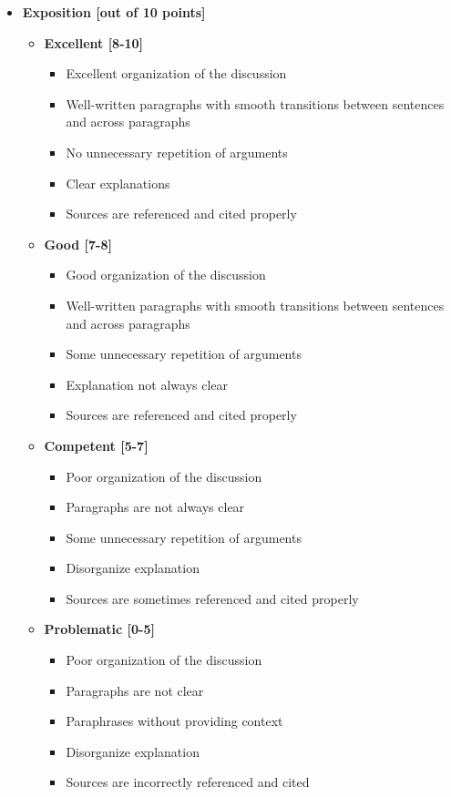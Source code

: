 \documentclass[letterpaper,12pt]{article}
\theoremstyle{dotlessS}
\begin{document}
\begin{itemize}
\item \textbf{Exposition [out of 10 points]}
\begin{itemize}
\item \textbf{Excellent [8-10]}
\begin{itemize}
\item Excellent organization of the discussion
\item Well-written paragraphs with smooth transitions between sentences and across paragraphs
\item No unnecessary repetition of arguments
\item Clear explanations
\item Sources are referenced and cited properly
\end{itemize}
\item \textbf{Good [7-8]}
\begin{itemize}
\item Good organization of the discussion
\item Well-written paragraphs with smooth transitions between sentences and across paragraphs
\item Some unnecessary repetition of arguments
\item Explanation not always clear
\item Sources are referenced and cited properly
\end{itemize}
\item \textbf{Competent [5-7]}
\begin{itemize}
\item Poor organization of the discussion
\item Paragraphs are not always clear 
\item Some unnecessary repetition of arguments 
\item Disorganize explanation
\item Sources are sometimes referenced and cited properly 
\end{itemize}
\item \textbf{Problematic [0-5]}
\begin{itemize}
\item Poor organization of the discussion
\item Paragraphs are not clear
\item Paraphrases without providing context 
\item Disorganize explanation
\item Sources are incorrectly referenced and cited
\end{itemize}
\end{itemize}
\end{itemize}
\end{document}
